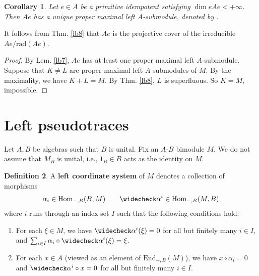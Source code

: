 \documentclass[11pt,b5paper,notitlepage]{article}
\theoremstyle{definition}
\newtheorem{df}{Definition}[section]
\theoremstyle{plain}
\newtheorem{co}[df]{Corollary}
\newcommand{\wch}{\widecheck}
\newcommand{\End}{\mathrm{End}} %
\newcommand{\Hom}{\mathrm{Hom}}
\newcommand{\rad}{\mathrm{rad}}
\numberwithin{equation}{section}
\begin{document}
\begin{co}\label{lb11}
Let $e\in A$ be a primitive idempotent satisfying $\dim eAe<+\infty$. Then $Ae$ has a unique proper maximal left $A$-submodule, denoted by \pmb{$\rad(Ae)$}.
\end{co}

It follows from Thm. \ref{lb8} that $Ae$ is the projective cover of the irreducible $Ae/\rad(Ae)$.

\begin{proof}
By Lem. \ref{lb7}, $Ae$ has at least one proper maximal left $A$-submodule. Suppose that $K\neq L$ are proper maximal left $A$-submodules of $M$. By the maximality, we have $K+L=M$. By Thm. \ref{lb8}, $L$ is superfluous. So $K=M$, impossible. 
\end{proof}





\section{Left pseudotraces}


Let $A,B$ be algebras such that $B$ is unital. Fix an $A$-$B$ bimodule $M$. We do not assume that $M_B$ is unital, i.e., $1_B\in B$ acts as the identity on $M$. 


\begin{df}\label{lb41}
A \textbf{left coordinate system} of $M$ denotes a collection of morphisms 
\begin{align}\label{eq10}
\alpha_i\in\Hom_{-,B}(B,M)\qquad \wch\alpha^i\in \Hom_{-,B}(M,B)
\end{align}
where $i$ runs through an index set $I$ such that the following conditions hold:
\begin{enumerate}[label=(\alph*)]
\item  For each $\xi\in M$, we have $\wch\alpha^i(\xi)=0$ for all but finitely many $i\in I$, and  $\sum_{i\in I}\alpha_i\circ\wch\alpha^i(\xi)=\xi$.
\item For each $x\in A$ (viewed as an element of $\End_{-,B}(M)$), we have $x\circ\alpha_i=0$ and $\wch\alpha^i\circ x=0$ for all but finitely many $i\in I$.
\end{enumerate}
\end{df}
\end{document}
